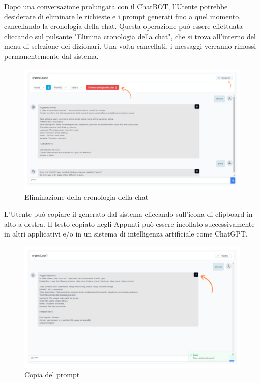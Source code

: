 
\par Dopo una conversazione prolungata con il ChatBOT, l'Utente potrebbe desiderare di eliminare le richieste e i prompt generati fino a quel momento, cancellando la cronologia della chat. Questa operazione può essere effettuata cliccando sul pulsante "Elimina cronologia della chat", che si trova all'interno del menu di selezione dei dizionari. Una volta cancellati, i messaggi verranno rimossi permanentemente dal sistema.

\begin{figure}[H]
  \centering
  \includegraphics[width=1\textwidth]{assets/elimina_chat.png}
  \caption{Eliminazione della cronologia della chat}
\end{figure}


\par L'Utente può copiare il  generato dal sistema cliccando sull'icona di clipboard in alto a destra. Il testo copiato negli Appunti può essere incollato successivamente in altri applicativi e/o in un sistema di intelligenza artificiale come ChatGPT.

\begin{figure}[H]
  \centering
  \includegraphics[width=1\textwidth]{assets/copia.png}
  \caption{Copia del prompt}
\end{figure}

